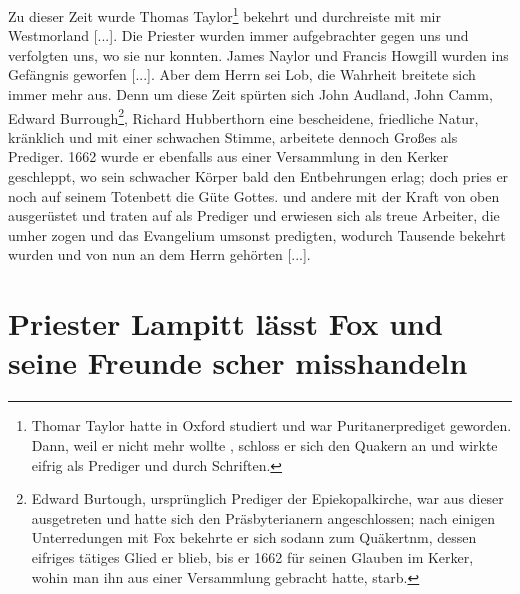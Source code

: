 Zu dieser Zeit wurde Thomas Taylor\footnote{Thomar Taylor 
hatte in Oxford studiert und war Puritanerprediget
geworden. Dann, weil er nicht mehr wollte 
, schloss er sich den Quakern an 
und wirkte eifrig als Prediger und durch Schriften.} bekehrt und 
durchreiste mit mir Westmorland [...]. 
Die Priester wurden immer
aufgebrachter gegen uns und verfolgten uns, wo sie nur konnten.
James Naylor und Francis 
Howgill wurden ins Gefängnis 
geworfen [...]. Aber dem Herrn sei Lob, die Wahrheit breitete sich
immer mehr aus. Denn um diese Zeit spürten sich 
John Audland, John 
Camm, Edward 
Burrough\footnote{Edward Burtough, ursprünglich 
Prediger der Epiekopalkirche, war
aus dieser ausgetreten und hatte sich den Präsbyterianern 
angeschlossen; nach einigen Unterredungen mit Fox bekehrte 
er sich sodann zum Quäkertnm, dessen eifriges tätiges Glied er 
blieb, bis er 1662 für seinen Glauben im Kerker, wohin
man ihn aus einer Versammlung gebracht hatte, starb.}, 
Richard Hubberthorn eine 
bescheidene, friedliche Natur, kränklich und
mit einer schwachen Stimme, arbeitete dennoch Großes als 
Prediger. 1662 wurde er ebenfalls aus einer 
Versammlung in den Kerker geschleppt, wo sein schwacher
Körper bald den Entbehrungen erlag; doch pries er noch 
auf seinem Totenbett die Güte Gottes.
und andere mit der Kraft von oben ausgerüstet und traten auf
als Prediger und erwiesen sich als treue Arbeiter, die umher
zogen und das Evangelium umsonst predigten, wodurch Tausende
bekehrt wurden und von nun an dem Herrn gehörten [...].

\section{Priester Lampitt lässt Fox und seine Freunde scher misshandeln}

